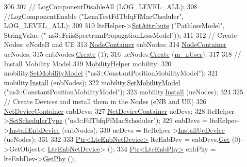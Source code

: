 \begin{DoxyCode}
306 
307 \textcolor{comment}{//   LogComponentDisableAll (LOG\_LEVEL\_ALL);}
308   \textcolor{comment}{//LogComponentEnable ("LenaTestFdTbfqFfMacCheduler", LOG\_LEVEL\_ALL);}
309    
310   lteHelper->\hyperlink{classns3_1_1ObjectBase_ac60245d3ea4123bbc9b1d391f1f6592f}{SetAttribute} (\textcolor{stringliteral}{"PathlossModel"}, StringValue (\textcolor{stringliteral}{"
      ns3::FriisSpectrumPropagationLossModel"}));
311 
312   \textcolor{comment}{// Create Nodes: eNodeB and UE}
313   \hyperlink{classns3_1_1NodeContainer}{NodeContainer} enbNodes;
314   \hyperlink{classns3_1_1NodeContainer}{NodeContainer} ueNodes;
315   enbNodes.\hyperlink{classns3_1_1NodeContainer_a787f059e2813e8b951cc6914d11dfe69}{Create} (1);
316   ueNodes.\hyperlink{classns3_1_1NodeContainer_a787f059e2813e8b951cc6914d11dfe69}{Create} (\hyperlink{classLenaFdTbfqFfMacSchedulerTestCase1_a95ad259ccc1d4dbc869d81fc7941406e}{m\_nUser});
317 
318   \textcolor{comment}{// Install Mobility Model}
319   \hyperlink{classns3_1_1MobilityHelper}{MobilityHelper} mobility;
320   mobility.\hyperlink{classns3_1_1MobilityHelper_a030275011b6f40682e70534d30280aba}{SetMobilityModel} (\textcolor{stringliteral}{"ns3::ConstantPositionMobilityModel"});
321   mobility.\hyperlink{classns3_1_1MobilityHelper_a07737960ee95c0777109cf2994dd97ae}{Install} (enbNodes);
322   mobility.\hyperlink{classns3_1_1MobilityHelper_a030275011b6f40682e70534d30280aba}{SetMobilityModel} (\textcolor{stringliteral}{"ns3::ConstantPositionMobilityModel"});
323   mobility.\hyperlink{classns3_1_1MobilityHelper_a07737960ee95c0777109cf2994dd97ae}{Install} (ueNodes);
324 
325   \textcolor{comment}{// Create Devices and install them in the Nodes (eNB and UE)}
326   \hyperlink{classns3_1_1NetDeviceContainer}{NetDeviceContainer} enbDevs;
327   \hyperlink{classns3_1_1NetDeviceContainer}{NetDeviceContainer} ueDevs;
328   lteHelper->\hyperlink{classns3_1_1LteHelper_a8f86e55b8b80a81732c4b2df00fb25d5}{SetSchedulerType} (\textcolor{stringliteral}{"ns3::FdTbfqFfMacScheduler"});
329   enbDevs = lteHelper->\hyperlink{classns3_1_1LteHelper_a5e009ad35ef85f46b5a6099263f15a03}{InstallEnbDevice} (enbNodes);
330   ueDevs = lteHelper->\hyperlink{classns3_1_1LteHelper_ac9cd932d7de92811cfa953c2e3b2fc9f}{InstallUeDevice} (ueNodes);
331 
332 
333   \hyperlink{classns3_1_1Ptr}{Ptr<LteEnbNetDevice>} lteEnbDev = enbDevs.\hyperlink{classns3_1_1NetDeviceContainer_a677d62594b5c9d2dea155cc5045f4d0b}{Get} (0)->GetObject<
      \hyperlink{classns3_1_1LteEnbNetDevice}{LteEnbNetDevice}> ();
334   \hyperlink{classns3_1_1Ptr}{Ptr<LteEnbPhy>} enbPhy = lteEnbDev->\hyperlink{classns3_1_1LteEnbNetDevice_a58db72130e0740f16a5e03b22e4a10a4}{GetPhy} ();

\end{DoxyCode}
